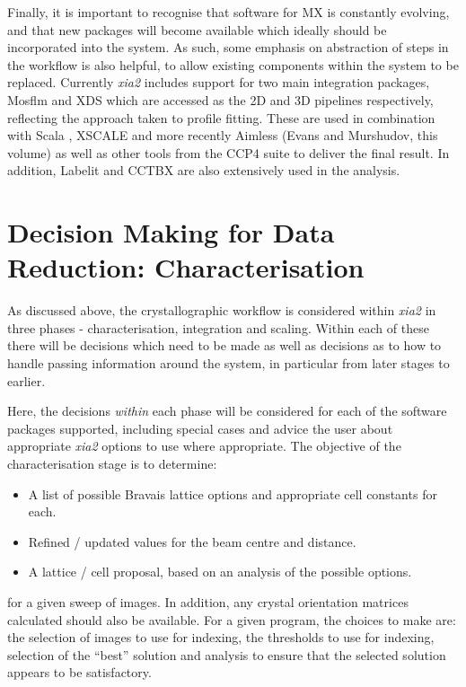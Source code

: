 \documentclass[preprint,pdf]{iucr}
\begin{document}
Finally, it is important to recognise that software for MX is
constantly evolving, and that new packages will become available which
ideally should be incorporated into the system. As such, some emphasis
on abstraction of steps in the workflow is also helpful, to allow
existing components within the system to be replaced. Currently \emph{xia2} 
includes support for two main integration packages, Mosflm
\cite{leslie1992rcm} and XDS \cite{Kabsch:dz5179}
which are accessed as the 2D and 3D
pipelines respectively, reflecting the approach taken to profile
fitting. These are used in combination with Scala \cite{Evans:ba5084}, XSCALE
and more recently Aimless (Evans and Murshudov, this volume) as well
as other
tools from the CCP4 suite to deliver the final result. In
addition, Labelit \cite{Sauter:dd5008} and CCTBX
\cite{Grosse-Kunstleve:ks0118} are also 
extensively used in the analysis.

\section{Decision Making for Data Reduction: Characterisation}

As discussed above, the crystallographic workflow is considered within
\emph{xia2} in three phases - characterisation, integration and
scaling. Within each of these there will be decisions which need to be
made as well as decisions as to how to handle passing information
around the system, in particular from later stages to earlier. 

Here, the decisions \emph{within} each phase will be considered for
each of the software packages supported, including special cases and
advice the user about appropriate \emph{xia2} options to use where
appropriate. The objective of the characterisation stage is to determine:

\begin{itemize}
\item{A list of possible Bravais lattice options and appropriate cell
    constants for each.}
\item{Refined / updated values for the beam centre and distance.}
\item{A lattice / cell proposal, based on an analysis of the possible
    options.}
\end{itemize}

\noindent
for a given sweep of images. In addition, any crystal orientation
matrices calculated
should also be available. For a given program, the choices to make
are: the selection of images to use for indexing, the thresholds to
use for indexing, selection of the ``best'' solution and analysis to
ensure that the selected solution appears to be satisfactory. 
\end{document}
